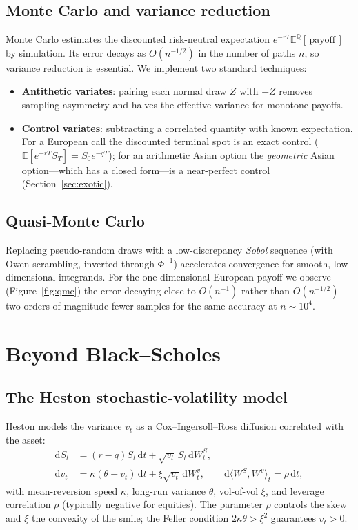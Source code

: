 \documentclass[11pt]{article}
\begin{document}
\subsection{Monte Carlo and variance reduction}
Monte Carlo estimates the discounted risk-neutral expectation
$e^{-rT}\mathbb{E}^{\mathbb{Q}}[\,\text{payoff}\,]$ by simulation. Its error
decays as $O(n^{-1/2})$ in the number of paths $n$, so variance reduction is
essential. We implement two standard techniques:
\begin{itemize}
\item \textbf{Antithetic variates}: pairing each normal draw $Z$ with $-Z$ removes
sampling asymmetry and halves the effective variance for monotone payoffs.
\item \textbf{Control variates}: subtracting a correlated quantity with known
expectation. For a European call the discounted terminal spot is an exact control
($\mathbb{E}[e^{-rT}S_T]=S_0 e^{-qT}$); for an arithmetic Asian option the
\emph{geometric} Asian option---which has a closed form---is a near-perfect
control (Section~\ref{sec:exotic}).
\end{itemize}

\subsection{Quasi-Monte Carlo}
Replacing pseudo-random draws with a low-discrepancy \emph{Sobol} sequence (with
Owen scrambling, inverted through $\Phi^{-1}$) accelerates convergence for
smooth, low-dimensional integrands. For the one-dimensional European payoff we
observe (Figure~\ref{fig:qmc}) the error decaying close to $O(n^{-1})$ rather
than $O(n^{-1/2})$---two orders of magnitude fewer samples for the same accuracy
at $n\sim10^4$.

\section{Beyond Black--Scholes}
\label{sec:beyond}

\subsection{The Heston stochastic-volatility model}
Heston \citep{heston1993} models the variance $v_t$ as a Cox--Ingersoll--Ross
diffusion correlated with the asset:
\begin{align}
\mathrm{d}S_t &= (r-q) S_t\,\mathrm{d}t + \sqrt{v_t}\,S_t\,\mathrm{d}W_t^S,\\
\mathrm{d}v_t &= \kappa(\theta - v_t)\,\mathrm{d}t + \xi\sqrt{v_t}\,\mathrm{d}W_t^v,
\qquad \mathrm{d}\langle W^S, W^v\rangle_t = \rho\,\mathrm{d}t,
\end{align}
with mean-reversion speed $\kappa$, long-run variance $\theta$, vol-of-vol $\xi$,
and leverage correlation $\rho$ (typically negative for equities). The parameter
$\rho$ controls the skew and $\xi$ the convexity of the smile; the Feller
condition $2\kappa\theta>\xi^2$ guarantees $v_t>0$.
\end{document}
